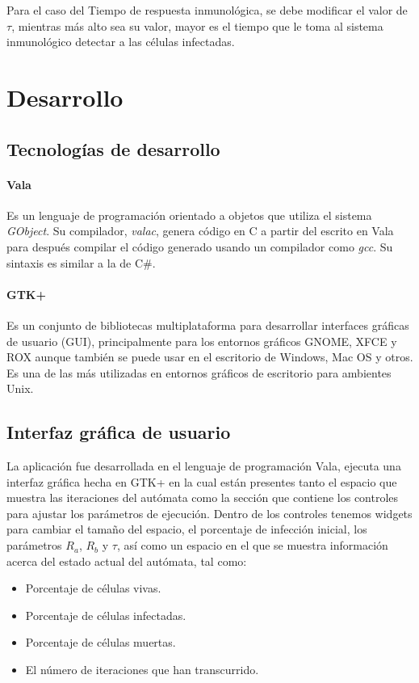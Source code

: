 \documentclass[12pt,letterpaper,oneside]{report}
\begin{document}
	Para el caso del Tiempo de respuesta inmunológica, se debe modificar el valor de $\tau$, mientras más alto sea su valor, mayor es el tiempo que le toma al sistema inmunológico detectar a las células infectadas.


    \chapter{Desarrollo}
    \section{Tecnologías de desarrollo} %
	\label{sec:tecnolog_as_de_desarrollo}
	\subsubsection{Vala}
	Es un lenguaje de programación orientado a objetos que utiliza el sistema \emph{GObject}. Su compilador, \emph{valac}, genera código en C a partir del escrito en Vala para después compilar el código generado usando un compilador como \emph{gcc}. Su sintaxis es similar a la de C\#.\\
	
	\subsubsection{GTK+}
	Es un conjunto de bibliotecas multiplataforma para desarrollar interfaces gráficas de usuario (GUI), principalmente para los entornos gráficos GNOME, XFCE y ROX aunque también se puede usar en el escritorio de Windows, Mac OS y otros. Es una de las más utilizadas en entornos gráficos de escritorio para ambientes Unix.\\

	\section{Interfaz gráfica de usuario} %
	\label{sec:interfaz_gr_fica_de_usuario}
    La aplicación fue desarrollada en el lenguaje de programación Vala, ejecuta una interfaz gráfica hecha en GTK+ en la cual están presentes tanto el espacio que muestra las iteraciones del autómata como la sección que contiene los controles para ajustar los parámetros de ejecución. Dentro de los controles tenemos widgets para cambiar el tamaño del espacio, el porcentaje de infección inicial, los parámetros $R_a$, $R_b$ y $\tau$, así como un espacio en el que se muestra información acerca del estado actual del autómata, tal como:
    \begin{itemize}
    	\item Porcentaje de células vivas.
    	\item Porcentaje de células infectadas.
    	\item Porcentaje de células muertas.
    	\item El número de iteraciones que han transcurrido.
    \end{itemize}
	
\end{document}
